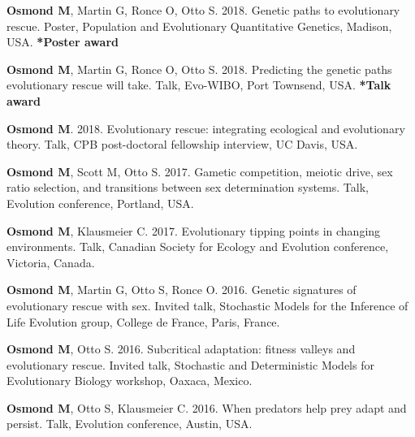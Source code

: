 \documentclass[12pt]{article}
\begin{document}
\textbf{Osmond M}, Martin G, Ronce O, Otto S. 2018. Genetic paths to evolutionary rescue. Poster, Population and Evolutionary Quantitative Genetics, Madison, USA. \textbf{*Poster award}


\textbf{Osmond M}, Martin G, Ronce O, Otto S. 2018. Predicting the genetic paths evolutionary rescue will take. Talk, Evo-WIBO, Port Townsend, USA. \textbf{*Talk award}


\textbf{Osmond M}. 2018. Evolutionary rescue: integrating ecological and evolutionary theory. Talk, CPB post-doctoral fellowship interview, UC Davis, USA. 

\textbf{Osmond M}, Scott M, Otto S. 2017. Gametic competition, meiotic drive, sex ratio selection, and transitions between sex determination systems. Talk, Evolution conference, Portland, USA. 

\textbf{Osmond M}, Klausmeier C. 2017. Evolutionary tipping points in changing environments. Talk, Canadian Society for Ecology and Evolution conference, Victoria, Canada. 

\textbf{Osmond M}, Martin G, Otto S, Ronce O. 2016. Genetic signatures of evolutionary rescue with sex. Invited talk, Stochastic Models for the Inference of Life Evolution group, College de France, Paris, France. 


\textbf{Osmond M}, Otto S. 2016. Subcritical adaptation: fitness valleys and evolutionary rescue. Invited talk, Stochastic and Deterministic Models for Evolutionary Biology workshop, Oaxaca, Mexico. 


\textbf{Osmond M}, Otto S, Klausmeier C. 2016. When predators help prey adapt and persist. Talk, Evolution conference, Austin, USA. 
\end{document}

